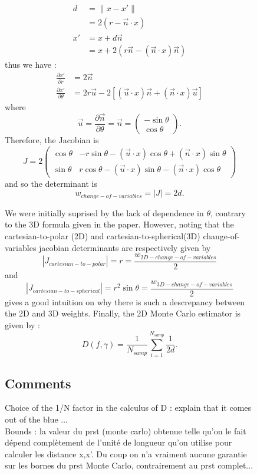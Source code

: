 \documentclass[10pt,a4paper]{article}			%
\begin{document}
\begin{figure}[h]
\begin{align*}
 d & = \lVert x-x' \rVert  \\
& = 2(r-\vec{n}\cdot x) \\
x' &= x+ d\vec{n}\\
&= x+ 2(r\vec{n} - (\vec{n}\cdot x)\vec{n})
\end{align*}
thus we have :
\begin{align*}
\frac{\partial x'}{\partial r}&=2\vec{n}\\
\frac{\partial x'}{\partial \theta}&= 2r\vec{u}-2[(\vec{u}\cdot x)\vec{n}+(\vec{n}\cdot x)\vec{u}]
\end{align*}
where 
\[\vec{u}=\frac{\partial \vec{n}}{\partial \theta} = \vec{n}=\begin{pmatrix}-\sin\theta \\ \cos\theta\end{pmatrix}.\]
Therefore, the Jacobian is
\[J = 2
\begin{pmatrix}
\cos\theta & -r\sin\theta-(\vec{u}\cdot x)\cos\theta+(\vec{n}\cdot x)\sin\theta\\
\sin\theta &  r \cos\theta - (\vec{u}\cdot x)\sin\theta - (\vec{n}\cdot x)\cos\theta
\end{pmatrix}\]
and so the determinant is
\[w_{change-of-variables} = |J| = 2d.\]

We were initially suprised by the lack of dependence in $\theta$, contrary to the 3D formula given in the paper. However, noting that the cartesian-to-polar (2D) and cartesian-to-spherical(3D) change-of-variables jacobian determinants are respectively given by \[|J_{cartesian-to-polar}| = r=\frac{w_{2D-change-of-variables}}{2}\] and \[|J_{cartesian-to-spherical}|=r^2\sin\theta=\frac{w_{3D-change-of-variables}}{2}\] gives a good intuition on why there is such a descrepancy between the 2D and 3D weights. Finally, the 2D Monte Carlo estimator is given by :\[D(f,\gamma) = \frac{1}{N_{samp}} \sum_{i=1}^{N_{samp}}\frac{1}{2d}.\]


  	\subsection{Comments}
  	Choice of the 1/N factor in the calculus of D : explain that it comes out of the blue ... \\
  	
  	Bounds : la valeur du prst (monte carlo) obtenue telle qu'on le fait dépend complètement de l'unité de longueur qu'on utilise pour calculer les distance x,x'. Du coup on n'a vraiment aucune garantie sur les bornes du prst Monte Carlo, contrairement au prst complet...\\
  	

\end{figure}
\end{document}
